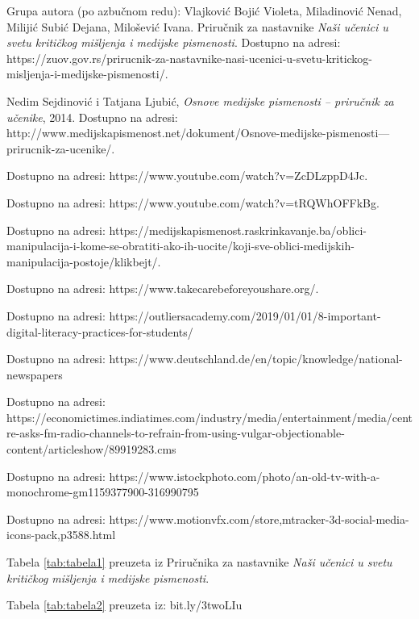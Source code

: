 \documentclass[a4paper]{article}
\begin{document}
\begin{thebibliography}{99}


 Grupa autora (po azbučnom redu): Vlajković Bojić Violeta, Miladinović Nenad, Milijić Subić Dejana, Milošević Ivana. Priručnik za nastavnike \emph{ Naši učenici u svetu kritičkog mišljenja i medijske pismenosti}. Dostupno na adresi: https://zuov.gov.rs/prirucnik-za-nastavnike-nasi-ucenici-u-svetu-kritickog-misljenja-i-medijske-pismenosti/.

 Nedim Sejdinović i Tatjana Ljubić, \emph{Osnove medijske pismenosti – priručnik za učenike}, 2014. Dostupno na adresi:
http://www.medijskapismenost.net/dokument/Osnove-medijske-pismenosti---prirucnik-za-ucenike/. 

 Dostupno na adresi: https://www.youtube.com/watch?v=ZcDLzppD4Jc.

 Dostupno na adresi: https://www.youtube.com/watch?v=tRQWhOFFkBg.

 Dostupno na adresi: https://medijskapismenost.raskrinkavanje.ba/oblici-manipulacija-i-kome-se-obratiti-ako-ih-uocite/koji-sve-oblici-medijskih-manipulacija-postoje/klikbejt/.

 Dostupno na adresi: https://www.takecarebeforeyoushare.org/.

 Dostupno na adresi: https://outliersacademy.com/2019/01/01/8-important-digital-literacy-practices-for-students/

 Dostupno na adresi: https://www.deutschland.de/en/topic/knowledge/national-newspapers

 Dostupno na adresi: https://economictimes.indiatimes.com/industry/media/entertainment/media/centre-asks-fm-radio-channels-to-refrain-from-using-vulgar-objectionable-content/articleshow/89919283.cms

 Dostupno na adresi: https://www.istockphoto.com/photo/an-old-tv-with-a-monochrome-gm1159377900-316990795

 Dostupno na adresi: https://www.motionvfx.com/store,mtracker-3d-social-media-icons-pack,p3588.html


 Tabela \ref{tab:tabela1} preuzeta iz Priručnika za nastavnike \emph{ Naši učenici u svetu kritičkog mišljenja i medijske pismenosti}.

 Tabela \ref{tab:tabela2} preuzeta iz: bit.ly/3twoLIu

\end{thebibliography}


\appendix
\end{document}
